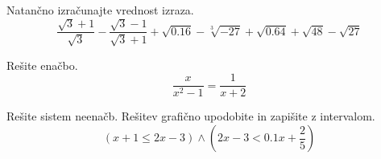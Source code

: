 \documentclass[addpoints]{exam}
\begin{document}
\begin{questions}


    \question
    Natančno izračunajte vrednost izraza.
    $$\dfrac{\sqrt{3}+1}{\sqrt{3}}-\dfrac{\sqrt{3}-1}{\sqrt{3}+1}+\sqrt{0.16}-\sqrt[3]{-27}+\sqrt{0.64}+\sqrt{48}-\sqrt{27}$$

    
    
    \question
    Rešite enačbo.
        $$ \dfrac{x}{x^2-1}=\dfrac{1}{x+2}$$
    
    





    \question
    Rešite sistem neenačb. Rešitev grafično upodobite in zapišite z intervalom.
    $$(x+1\leq 2x-3)\land(2x-3<0.1x+\frac{2}{5})$$
    





\end{questions}
\end{document}
